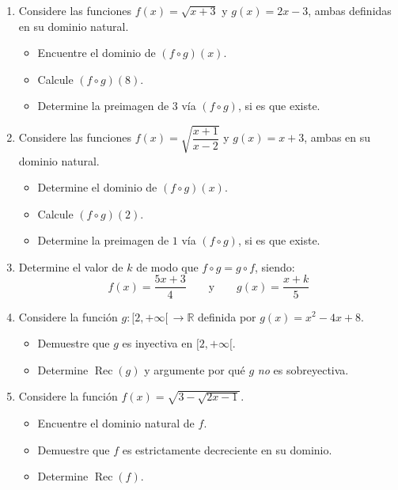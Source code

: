 \documentclass[letterpaper, 12pt]{article}
\begin{document}
\begin{enumerate}[label=\color{azulFuerte}\bfseries\arabic*., leftmargin=*, itemsep=1.4em, start=6]

\item Considere las funciones $f(x)=\sqrt{x+3}$ y $g(x)=2x-3$, ambas definidas en su dominio natural.
\begin{itemize}
    \item Encuentre el dominio de $(f\circ g)(x)$.
    \item Calcule $(f\circ g)(8)$.
    \item Determine la preimagen de $3$ vía $(f\circ g)$, si es que existe.
\end{itemize}

\item Considere las funciones $f(x)=\sqrt{\dfrac{x+1}{x-2}}$ y $g(x)=x+3$, ambas en su dominio natural.
\begin{itemize}
    \item Determine el dominio de $(f\circ g)(x)$.
    \item Calcule $(f\circ g)(2)$.
    \item Determine la preimagen de $1$ vía $(f\circ g)$, si es que existe.
\end{itemize}

\item Determine el valor de $k$ de modo que $f\circ g = g\circ f$, siendo:
\[
    f(x) = \frac{5x+3}{4} \qquad \text{y} \qquad g(x)=\frac{x+k}{5}
\]

\item Considere la función $g:[2,+\infty[\,\to\mathbb{R}$ definida por
$g(x)=x^{2}-4x+8$.
\begin{itemize}
    \item Demuestre que $g$ es inyectiva en $[2,+\infty[$.
    \item Determine $\operatorname{Rec}(g)$ y argumente por qué $g$ \emph{no} es sobreyectiva.
\end{itemize}

\item Considere la función $f(x)=\sqrt{3-\sqrt{2x-1}}$.
\begin{itemize}
    \item Encuentre el dominio natural de $f$.
    \item Demuestre que $f$ es estrictamente decreciente en su dominio.
    \item Determine $\operatorname{Rec}(f)$.
\end{itemize}

\end{enumerate}
\end{document}
